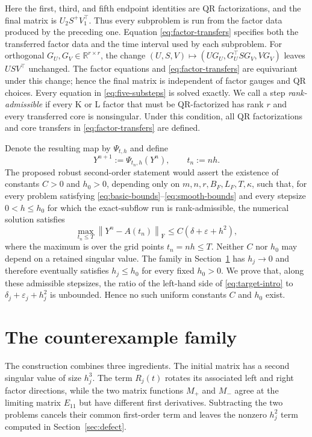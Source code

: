 \documentclass[10pt,a4paper]{amsart}
\numberwithin{equation}{section}
\newcommand{\F}{\mathrm F}
\newcommand{\norm}[1]{\left\lVert #1\right\rVert}
\newcommand{\eps}{\varepsilon}
\begin{document}
Here the first, third, and fifth endpoint identities are QR
factorizations, and the final matrix is
$U_2S^+V_1^\top$.  Thus every subproblem is run from the factor data
produced by the preceding one.  Equation \eqref{eq:factor-transfers}
specifies both the transferred factor data and the time interval used by
each subproblem.
For orthogonal $G_U,G_V\in\mathbb R^{r\times r}$, the change
$(U,S,V)\mapsto(UG_U,G_U^\top SG_V,VG_V)$ leaves $USV^\top$ unchanged.
The factor equations and \eqref{eq:factor-transfers} are equivariant
under this change; hence the final matrix is independent of factor
gauges and QR choices.
Every equation in \eqref{eq:five-substeps} is solved exactly.  We call a
step \emph{rank-admissible} if every K or L factor that must be
QR-factorized has rank $r$ and every transferred core is nonsingular.
Under this condition, all QR factorizations and core transfers in
\eqref{eq:factor-transfers} are defined.

Denote the resulting map by $\Psi_{t,h}$ and define
\begin{equation}\label{eq:numerical-method}
 Y^{n+1}:=\Psi_{t_n,h}(Y^n),\qquad t_n:=nh.
\end{equation}
The proposed robust second-order statement would assert the existence
of constants $C>0$ and $h_0>0$, depending only on
$m,n,r,B_F,L_F,T,\kappa$, such that, for every problem satisfying
\eqref{eq:basic-bounds}--\eqref{eq:smooth-bounds} and every stepsize
$0<h\le h_0$ for which the exact-subflow run is rank-admissible, the
numerical solution satisfies
\begin{equation}\label{eq:target-intro}
 \max_{t_n\le T}\norm{Y^n-A(t_n)}_{\F}
 \le C(\delta+\eps+h^2),
\end{equation}
where the maximum is over the grid points $t_n=nh\le T$.  Neither $C$
nor $h_0$ may depend on a retained singular value.  The family in
Section~\ref{sec:construction}
has $h_j\to0$ and therefore eventually satisfies $h_j\le h_0$ for
every fixed $h_0>0$.
We prove that, along these admissible stepsizes, the ratio of the
left-hand side of \eqref{eq:target-intro} to
$\delta_j+\eps_j+h_j^2$ is unbounded.  Hence no such uniform constants
$C$ and $h_0$ exist.

\section{The counterexample family}
\label{sec:construction}

The construction combines three ingredients.  The initial matrix has a
second singular value of size $h_j^3$.  The term $R_j(t)$ rotates its
associated left and right factor directions, while the two matrix
functions $M_+$ and $M_-$ agree at the limiting matrix $E_{11}$ but have
different first derivatives.  Subtracting the two problems cancels their
common first-order term and leaves the nonzero $h_j^2$ term computed in
Section~\ref{sec:defect}.
\end{document}
